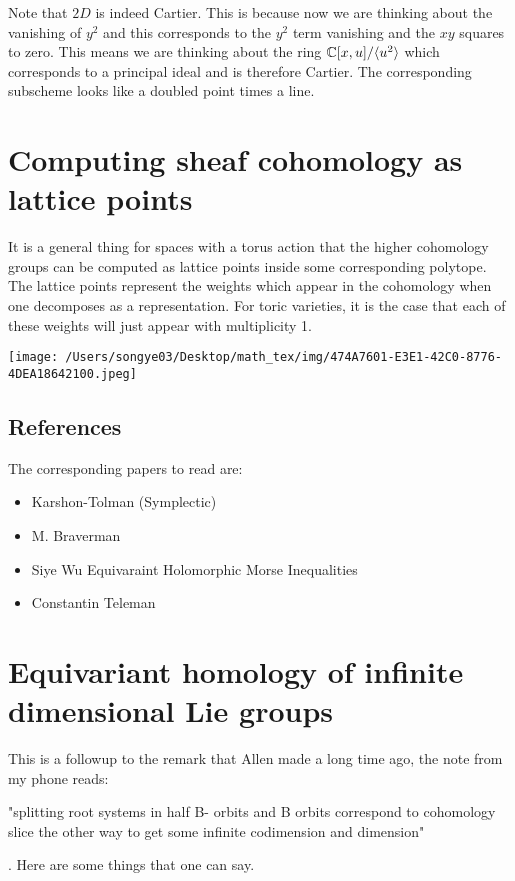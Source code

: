 \documentclass[12pt]{article}
\begin{document}
\hfill

Note that $2D$ is indeed Cartier. This is because now we are thinking about the vanishing of $y^2$ and this corresponds to the $y^2$ term vanishing and the $xy$ squares to zero. This means we are thinking about the ring $\mathbb{C}[x,u]/\langle{u^2}\rangle$ which corresponds to a principal ideal and is therefore Cartier. The corresponding subscheme looks like a doubled point times a line.


\section{Computing sheaf cohomology as lattice points}

It is a general thing for spaces with a torus action that the higher cohomology groups can be computed as lattice points inside some corresponding polytope. The lattice points represent the weights which appear in the cohomology when one decomposes as a representation. For toric varieties, it is the case that each of these weights will just appear with multiplicity 1.

\begin{center}
    \texttt{[image: /Users/songye03/Desktop/math\_tex/img/474A7601-E3E1-42C0-8776-4DEA18642100.jpeg]}
\end{center}

\subsection{References}
The corresponding papers to read are: 
\begin{itemize}
    \item Karshon-Tolman (Symplectic)
    \item M. Braverman
    \item Siye Wu Equivaraint Holomorphic Morse Inequalities
    \item Constantin Teleman
\end{itemize}


\section{Equivariant homology of infinite dimensional Lie groups}
This is a followup to the remark that Allen made a long time ago, the note from my phone reads:

\begin{remark}
    "splitting root systems in half B- orbits and B orbits correspond to cohomology slice the other way to get some infinite codimension and dimension"
\end{remark}
. Here are some things that one can say.
\end{document}
